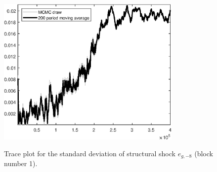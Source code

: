 \begin{figure}[H]
\centering
  \includegraphics[width=0.8\textwidth]{BRS_sectoral/graphs/TracePlot_SE_e_g_news_8_blck_1}\\
    \caption{Trace plot for the standard deviation of structural shock ${e_{g,-8}}$ (block number 1).}
\end{figure}
